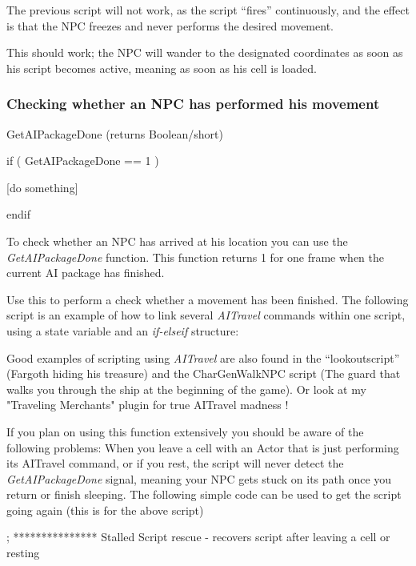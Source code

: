 The previous script will not work, as the script ``fires'' continuously,
and the effect is that the NPC freezes and never performs the desired
movement.



This should work; the NPC will wander to the designated coordinates as
soon as his script becomes active, meaning as soon as his cell is
loaded.

\hypertarget{checking-whether-an-npc-has-performed-his-movement}{%
\subsubsection{Checking whether an NPC has performed his
movement}\label{checking-whether-an-npc-has-performed-his-movement}}

GetAIPackageDone (returns Boolean/short)

if ( GetAIPackageDone == 1 )

{[}do something{]}

endif

To check whether an NPC has arrived at his location you can use the
\emph{GetAIPackageDone} function. This function returns 1 for one frame
when the current AI package has finished.

Use this to perform a check whether a movement has been finished. The
following script is an example of how to link several \emph{AITravel}
commands within one script, using a state variable and an
\emph{if-elseif} structure:



Good examples of scripting using \emph{AITravel} are also found in the
``lookoutscript'' (Fargoth hiding his treasure) and the CharGenWalkNPC
script (The guard that walks you through the ship at the beginning of
the game). Or look at my "Traveling Merchants" plugin for true AITravel
madness !

If you plan on using this function extensively you should be aware of
the following problems: When you leave a cell with an Actor that is just
performing its AITravel command, or if you rest, the script will never
detect the \emph{GetAIPackageDone} signal, meaning your NPC gets stuck
on its path once you return or finish sleeping. The following simple
code can be used to get the script going again (this is for the above
script)


; *************** Stalled Script rescue - recovers script after leaving
a cell or resting

